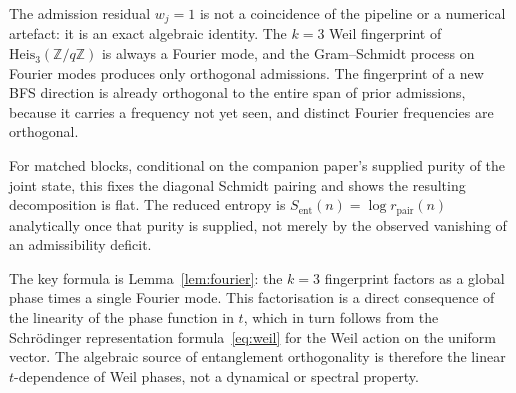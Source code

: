 \documentclass[11pt]{article}
\newcommand{\Heis}{\mathrm{Heis}}
\newcommand{\Sent}{S_{\mathrm{ent}}}
\newcommand{\rpair}{r_{\mathrm{pair}}}
\begin{document}
    The admission residual $w_j=1$ is not a coincidence of the pipeline or a numerical
    artefact: it is an exact algebraic identity.
    The $k{=}3$ Weil fingerprint of $\Heis_3(\mathbb{Z}/q\mathbb{Z})$ is always a Fourier
    mode, and the Gram--Schmidt process on Fourier modes produces only orthogonal
    admissions.
    The fingerprint of a new BFS direction is already orthogonal to the entire span of
    prior admissions, because it carries a frequency not yet seen, and distinct Fourier
    frequencies are orthogonal.

    For matched blocks, conditional on the companion paper's supplied purity of the
    joint state, this fixes the diagonal Schmidt pairing and shows the resulting
    decomposition is flat.
    The reduced entropy is $\Sent(n)=\log\rpair(n)$ analytically once that purity is
    supplied, not merely by the observed vanishing of an admissibility deficit.

    The key formula is Lemma~\ref{lem:fourier}: the $k{=}3$ fingerprint factors as a
    global phase times a single Fourier mode.
    This factorisation is a direct consequence of the linearity of the phase function in
    $t$, which in turn follows from the Schr\"odinger representation formula~\eqref{eq:weil}
    for the Weil action on the uniform vector.
    The algebraic source of entanglement orthogonality is therefore the linear
    $t$-dependence of Weil phases, not a dynamical or spectral property.

    \newpage
    
    
\end{document}
